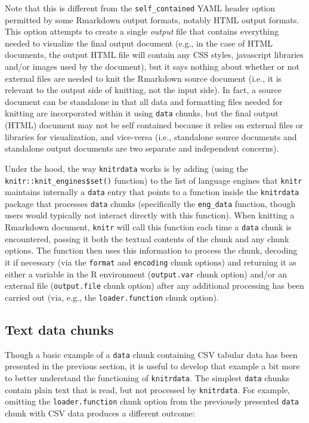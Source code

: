 Note that this is different from the \texttt{self\_contained} YAML header option permitted by some Rmarkdown output formats, notably HTML output formats. This option attempts to create a single \emph{output} file that contains everything needed to visualize the final output document (e.g., in the case of HTML documents, the output HTML file will contain any CSS styles, javascript libraries and/or images used by the document), but it says nothing about whether or not external files are needed to knit the Rmarkdown source document (i.e., it is relevant to the output side of knitting, not the input side). In fact, a source document can be standalone in that all data and formatting files needed for knitting are incorporated within it using \texttt{data} chunks, but the final output (HTML) document may not be self contained because it relies on external files or libraries for visualization, and vice-versa (i.e., standalone source documents and standalone output documents are two separate and independent concerns).

Under the hood, the way \texttt{knitrdata} works is by adding (using the \texttt{knitr::knit\_engines\$set()} function) to the list of language engines that \texttt{knitr} maintains internally a \texttt{data} entry that points to a function inside the \texttt{knitrdata} package that processes \texttt{data} chunks (specifically the \texttt{eng\_data} function, though users would typically not interact directly with this function). When knitting a Rmarkdown document, \texttt{knitr} will call this function each time a \texttt{data} chunk is encountered, passing it both the textual contents of the chunk and any chunk options. The function then uses this information to process the chunk, decoding it if necessary (via the \texttt{format} and \texttt{encoding} chunk options) and returning it as either a variable in the R environment (\texttt{output.var} chunk option) and/or an external file (\texttt{output.file} chunk option) after any additional processing has been carried out (via, e.g., the \texttt{loader.function} chunk option).

\hypertarget{text-data-chunks}{%
\subsection{Text data chunks}\label{text-data-chunks}}

Though a basic example of a \texttt{data} chunk containing CSV tabular data has been presented in the previous section, it is useful to develop that example a bit more to better understand the functioning of \texttt{knitrdata}. The simplest \texttt{data} chunks contain plain text that is read, but not processed by \texttt{knitrdata}. For example, omitting the \texttt{loader.function} chunk option from the previously presented \texttt{data} chunk with CSV data produces a different outcome:

